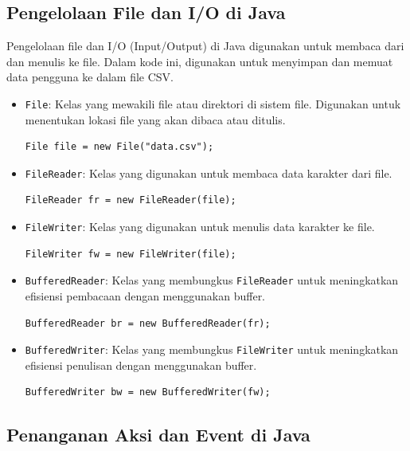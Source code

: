 \subsection{Pengelolaan File dan I/O di Java}

Pengelolaan file dan I/O (Input/Output) di Java digunakan untuk membaca dari dan menulis ke file. Dalam kode ini, digunakan untuk menyimpan dan memuat data pengguna ke dalam file CSV.

\begin{itemize}
	\item \texttt{File}: Kelas yang mewakili file atau direktori di sistem file. Digunakan untuk menentukan lokasi file yang akan dibaca atau ditulis.
	\begin{lstlisting}[style=JavaStyle]
		File file = new File("data.csv");
	\end{lstlisting}
	
	\item \texttt{FileReader}: Kelas yang digunakan untuk membaca data karakter dari file.
	\begin{lstlisting}[style=JavaStyle]
		FileReader fr = new FileReader(file);
	\end{lstlisting}
	
	\item \texttt{FileWriter}: Kelas yang digunakan untuk menulis data karakter ke file.
	\begin{lstlisting}[style=JavaStyle]
		FileWriter fw = new FileWriter(file);
	\end{lstlisting}
	
	\item \texttt{BufferedReader}: Kelas yang membungkus \texttt{FileReader} untuk meningkatkan efisiensi pembacaan dengan menggunakan buffer.
	\begin{lstlisting}[style=JavaStyle]
		BufferedReader br = new BufferedReader(fr);
	\end{lstlisting}
	
	\item \texttt{BufferedWriter}: Kelas yang membungkus \texttt{FileWriter} untuk meningkatkan efisiensi penulisan dengan menggunakan buffer.
	\begin{lstlisting}[style=JavaStyle]
		BufferedWriter bw = new BufferedWriter(fw);
	\end{lstlisting}
\end{itemize}

\subsection{Penanganan Aksi dan Event di Java}

